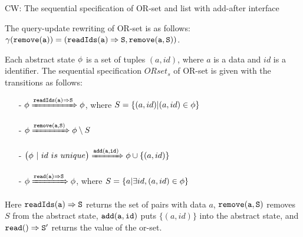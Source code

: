 {\color {red} CW: The sequential specification of OR-set and list with add-after interface}
\begin{example}
\label{definition:sequential specification of or-set}
The query-update rewriting of OR-set is as follows: $\gamma( \alabelshort[{\tt remove}]{a} ) = ( \alabellong[{\tt readIds}]{a}{S}{}, \alabelshort[{\tt remove}]{a,S})$.

Each abstract state $\phi$ is a set of tuples $(a,id)$, where $a$ is a data and $id$ is a identifier. The sequential specification $\mathit{ORset}_s$ of OR-set is given with the transitions as follows:

\begin{itemize}
\setlength{\itemsep}{0.5pt}
\item[-] $\abstate \xRightarrow{\alabellong[{\tt readIds}]{a}{ S }{} } \abstate$, where $S = \{ (a,id) \vert (a,id) \in \phi \}$ 

\item[-] $\abstate \xRightarrow{ \alabelshort[{\tt remove}]{a,S} }  \abstate \setminus S$

\item[-] $\big(\abstate\ |\ id \ is \ unique \big) \xRightarrow{ \alabelshort[{\tt add}]{a,id} }  \abstate \cup \{ (a,id) \}$

\item[-] $\abstate \xRightarrow{\alabellong[{\tt read}]{a}{ S }{}} \abstate$, where $S = \{ a \vert \exists id, (a,id) \in \phi \}$ 
\end{itemize}

Here $\alabellong[{\tt readIds}]{a}{S}{}$ returns the set of pairs with data $a$, $\alabelshort[{\tt remove}]{a,S}$ removes $S$ from the abstract state, $\alabelshort[{\tt add}]{a,id}$ puts $\{ (a,id) \}$ into the abstract state, and $\alabellong[{\tt read}]{}{S'}{}$ returns the value of the or-set.
\end{example}



